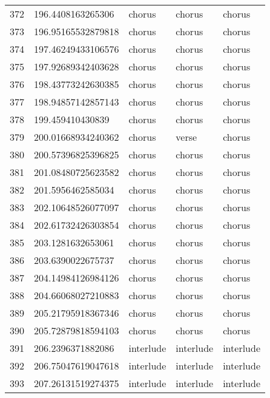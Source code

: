 \begin{table}[]
\begin{tabular}{lllll}
    372  & 196.4408163265306  & chorus       & chorus          & chorus         \\
    373  & 196.95165532879818 & chorus       & chorus          & chorus         \\
    374  & 197.46249433106576 & chorus       & chorus          & chorus         \\
    375  & 197.92689342403628 & chorus       & chorus          & chorus         \\
    376  & 198.43773242630385 & chorus       & chorus          & chorus         \\
    377  & 198.94857142857143 & chorus       & chorus          & chorus         \\
    378  & 199.459410430839   & chorus       & chorus          & chorus         \\
    379  & 200.01668934240362 & chorus       & verse           & chorus         \\
    380  & 200.57396825396825 & chorus       & chorus          & chorus         \\
    381  & 201.08480725623582 & chorus       & chorus          & chorus         \\
    382  & 201.5956462585034  & chorus       & chorus          & chorus         \\
    383  & 202.10648526077097 & chorus       & chorus          & chorus         \\
    384  & 202.61732426303854 & chorus       & chorus          & chorus         \\
    385  & 203.1281632653061  & chorus       & chorus          & chorus         \\
    386  & 203.6390022675737  & chorus       & chorus          & chorus         \\
    387  & 204.14984126984126 & chorus       & chorus          & chorus         \\
    388  & 204.66068027210883 & chorus       & chorus          & chorus         \\
    389  & 205.21795918367346 & chorus       & chorus          & chorus         \\
    390  & 205.72879818594103 & chorus       & chorus          & chorus         \\
    391  & 206.2396371882086  & interlude    & interlude       & interlude      \\
    392  & 206.75047619047618 & interlude    & interlude       & interlude      \\
    393  & 207.26131519274375 & interlude    & interlude       & interlude      \\

\end{tabular}
\end{table}

